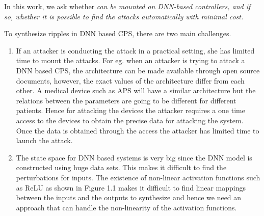 

In this work, we ask whether { \attack \em can be mounted on DNN-based controllers, and if so, whether it is possible to find the attacks automatically with minimal cost.} 


To synthesize ripples in DNN based CPS, there are two main challenges.
\begin{enumerate}

	\item If an attacker is conducting the attack in a practical setting, she has limited time to mount the attacks. For eg. when an attacker is trying to attack a DNN based CPS, the architecture can be made available through open source documents, however, the exact values of the architecture differ from each other. A medical device such as \ac{APS} will have a similar architecture but the relations between the parameters are going to be different for different patients. Hence for attacking the devices the attacker requires a one time access to the devices to obtain the precise data for attacking the system. Once the data is obtained through the access the attacker has limited time to launch the attack.  %
	\item The state space for DNN based systems is very big since the DNN model is constructed using huge data sets. This makes it difficult to find the perturbations for inputs. The existence of non-linear activation functions such as ReLU as shown in Figure 1.1 makes it difficult to find linear mappings between the inputs and the outputs to synthesize \attack and hence we need an approach that can handle the  non-linearity of the activation functions. 
\end{enumerate}

